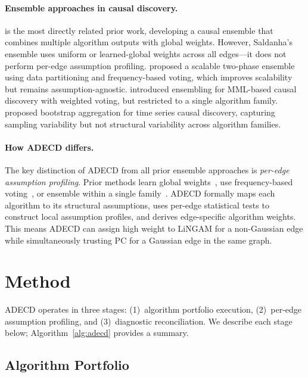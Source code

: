 \documentclass{article}
\newcommand{\adecd}{\textsc{ADECD}}
\begin{document}
\paragraph{Ensemble approaches in causal discovery.}
\citet{saldanha2020evaluation} is the most directly related prior work, developing a causal ensemble that combines multiple algorithm outputs with global weights.
However, Saldanha's ensemble uses uniform or learned-global weights across all edges---it does not perform per-edge assumption profiling.
\citet{guo2021scalable} proposed a scalable two-phase ensemble using data partitioning and frequency-based voting, which improves scalability but remains assumption-agnostic.
\citet{dai2004ensembling} introduced ensembling for MML-based causal discovery with weighted voting, but restricted to a single algorithm family.
\citet{debeire2024bootstrap} proposed bootstrap aggregation for time series causal discovery, capturing sampling variability but not structural variability across algorithm families.

\paragraph{How \adecd{} differs.}
The key distinction of \adecd{} from all prior ensemble approaches is \emph{per-edge assumption profiling}.
Prior methods learn global weights~\citep{saldanha2020evaluation}, use frequency-based voting~\citep{guo2021scalable}, or ensemble within a single family~\citep{dai2004ensembling}.
\adecd{} formally maps each algorithm to its structural assumptions, uses per-edge statistical tests to construct local assumption profiles, and derives edge-specific algorithm weights.
This means \adecd{} can assign high weight to LiNGAM for a non-Gaussian edge while simultaneously trusting PC for a Gaussian edge in the same graph.

\section{Method}
\label{sec:method}

\adecd{} operates in three stages: (1)~algorithm portfolio execution, (2)~per-edge assumption profiling, and (3)~diagnostic reconciliation. We describe each stage below; Algorithm~\ref{alg:adecd} provides a summary.

\subsection{Algorithm Portfolio}
\end{document}
